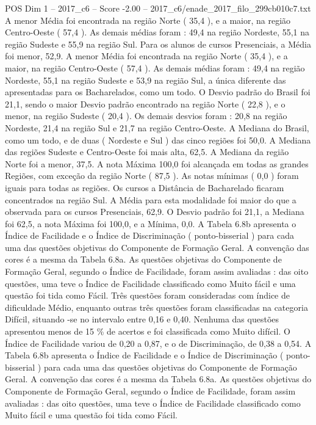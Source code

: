 \begin{textsample}{POS Dim 1 – 2017\_c6 – Score -2.00 – 2017\_c6/enade\_2017\_filo\_299cb010c7.txt}
A menor Média foi encontrada na região Norte ( 35,4 ), e a maior, na região Centro-Oeste ( 57,4 ).
As demais médias foram : 49,4 na região Nordeste, 55,1 na região Sudeste e 55,9 na região Sul.
Para os alunos de cursos Presenciais, a Média foi menor, 52,9.
A menor Média foi encontrada na região Norte ( 35,4 ), e a maior, na região Centro-Oeste ( 57,4 ).
As demais médias foram : 49,4 na região Nordeste, 55,1 na região Sudeste e 53,9 na região Sul, a única diferente das apresentadas para os Bacharelados, como um todo.
O Desvio padrão do Brasil foi 21,1, sendo o maior Desvio padrão encontrado na região Norte ( 22,8 ), e o menor, na região Sudeste ( 20,4 ).
Os demais desvios foram : 20,8 na região Nordeste, 21,4 na região Sul e 21,7 na região Centro-Oeste.
A Mediana do Brasil, como um todo, e de duas ( Nordeste e Sul ) das cinco regiões foi 50,0.
A Mediana das regiões Sudeste e Centro-Oeste foi mais alta, 62,5.
A Mediana da região Norte foi a menor, 37,5.
A nota Máxima 100,0 foi alcançada em todas as grandes Regiões, com exceção da região Norte ( 87,5 ).
As notas mínimas ( 0,0 ) foram iguais para todas as regiões.
Os cursos a Distância de Bacharelado ficaram concentrados na região Sul.
A Média para esta modalidade foi maior do que a observada para os cursos Presenciais, 62,9.
O Desvio padrão foi 21,1, a Mediana foi 62,5, a nota Máxima foi 100,0, e a Mínima, 0,0.
A Tabela 6.8b apresenta o Índice de Facilidade e o Índice de Discriminação ( ponto-bisserial ) para cada uma das questões objetivas do Componente de Formação Geral.
A convenção das cores é a mesma da Tabela 6.8a.
As questões objetivas do Componente de Formação Geral, segundo o Índice de Facilidade, foram assim avaliadas : das oito questões, uma teve o Índice de Facilidade classificado como Muito fácil e uma questão foi tida como Fácil.
Três questões foram consideradas com índice de dificuldade Médio, enquanto outras três questões foram classificadas na categoria Difícil, situando -se no intervalo entre 0,16 e 0,40.
Nenhuma das questões apresentou menos de 15 \% de acertos e foi classificada como Muito difícil.
O Índice de Facilidade variou de 0,20 a 0,87, e o de Discriminação, de 0,38 a 0,54.
A Tabela 6.8b apresenta o Índice de Facilidade e o Índice de Discriminação ( ponto-bisserial ) para cada uma das questões objetivas do Componente de Formação Geral.
A convenção das cores é a mesma da Tabela 6.8a.
As questões objetivas do Componente de Formação Geral, segundo o Índice de Facilidade, foram assim avaliadas : das oito questões, uma teve o Índice de Facilidade classificado como Muito fácil e uma questão foi tida como Fácil.

\end{textsample}
